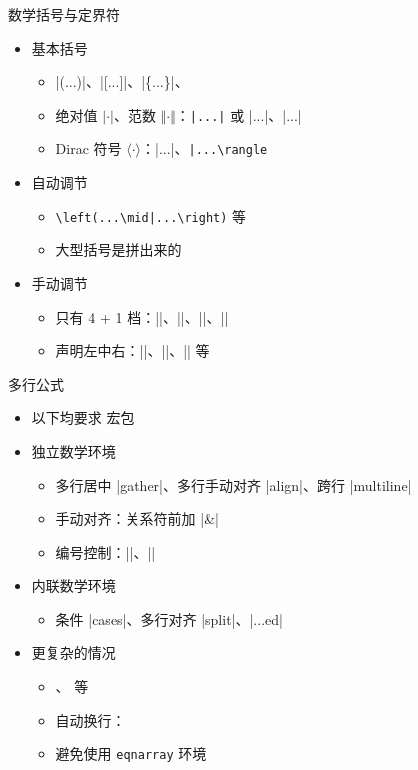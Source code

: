 \begin{frame}[fragile]{数学括号与定界符}
\begin{itemize}
  \item<+-> 基本括号
    \begin{itemize}
      \item |(...)|、|[...]|、|\{...\}|、
      \item 绝对值 $\vert\cdot\vert$、范数 $\Vert\cdot\Vert$：\lstinline[style=styleinline]+|...|+ 或 |\vert...\vert|、|\Vert...\Vert|
      \item Dirac 符号 $\langle\cdot\rangle$：|\langle...\rangle|、\lstinline[style=styleinline]+|...\rangle+
    \end{itemize}

  \item<+-> 自动调节
    \begin{itemize}
      \item \lstinline[style=styleinline]+\left(...\mid|...\right)+ 等
      \item 大型括号是拼出来的
    \end{itemize}

  \item<+-> 手动调节
    \begin{itemize}
      \item 只有 4 + 1 档：|\big|、|\Big|、|\bigg|、|\Bigg|
      \item 声明左中右：|\bigl|、|\bigm|、|\bigr| 等
    \end{itemize}
\end{itemize}
\end{frame}

\begin{frame}[fragile]{多行公式}
\begin{itemize}
  \item 以下均要求  宏包
  \item 独立数学环境
    \begin{itemize}
      \item 多行居中 |gather|、多行手动对齐 |align|、跨行 |multiline|
      \item 手动对齐：关系符前加 |&|
      \item 编号控制：||、|\notag|
    \end{itemize}

  \item 内联数学环境
    \begin{itemize}
      \item 条件 |cases|、多行对齐 |split|、|...ed|
    \end{itemize} \pause

  \item 更复杂的情况
    \begin{itemize}
      \item {}、 等
      \item 自动换行：
      \item \alert{避免使用 \texttt{eqnarray} 环境} 
    \end{itemize}
\end{itemize}
\end{frame}

